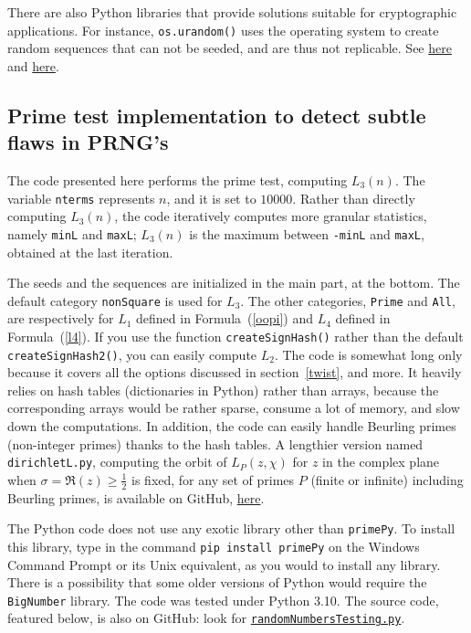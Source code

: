 \documentclass[oneside,10pt]{book}
\begin{document}
There are also Python libraries that provide solutions suitable for cryptographic applications. For instance, 
\texttt{os.urandom()} 
uses the operating system to create random sequences that can not be seeded, and are thus not replicable.
See \href{https://docs.python.org/3/library/os.html#os.urandom}{here} and 
\href{https://docs.python.org/3/library/secrets.html\#module-secrets}{here}.

\subsection{Prime test implementation to detect subtle flaws in PRNG's}\label{prngpython}

The code presented here performs the prime test, computing $L_3(n)$. The variable \texttt{nterms} represents $n$, and it is set to
 $\num{10000}$. Rather than directly computing $L_3(n)$, the code iteratively computes more granular statistics, namely \texttt{minL} and \texttt{maxL}; $L_3(n)$ is the maximum between \texttt{-minL} and \texttt{maxL}, obtained at the last iteration. 

The seeds and the sequences are initialized in the main part, at the bottom. The default category \texttt{nonSquare} is used for $L_3$. The other categories, \texttt{Prime} and \texttt{All}, are respectively for $L_1$ defined in Formula~(\ref{oopi}) and $L_4$ defined in Formula~(\ref{l4}). If you use the function \texttt{createSignHash()} rather 
than the default \texttt{createSignHash2()}, you can easily compute $L_2$. The code is somewhat long only because it covers all the options discussed 
 in section~\ref{twist}, and more. It heavily relies on hash tables (dictionaries in Python) rather than arrays, because the corresponding arrays would be  rather sparse, consume a lot of memory, and slow down the computations. In addition, the code can easily handle Beurling primes (non-integer primes) thanks to the hash tables. A lengthier version named \texttt{dirichletL.py}, computing the orbit of $L_P(z,\chi)$ for $z$ in the complex plane
 when $\sigma=\Re(z)\geq \frac{1}{2}$ is fixed, for any set of primes $P$ (finite or infinite) including Beurling primes, is available on GitHub, \href{https://github.com/VincentGranville/Experimental-Math-Number-Theory/blob/main/Source-Code/dirichletL.py}{here}. 

The Python code does not use any exotic library other than \texttt{primePy}.  To install this library,
 type in the command \texttt{pip install primePy} on the Windows Command Prompt or its Unix equivalent, as you would to install any library.
There is a possibility that some older versions of Python would require the \texttt{BigNumber} library. The code was tested under Python 3.10.
The source code, featured below, is also on GitHub: look for \href{https://github.com/VincentGranville/Experimental-Math-Number-Theory/blob/main/Source-Code/randomNumbersTesting.py}{\texttt{randomNumbersTesting.py}}.  \\
\end{document}
